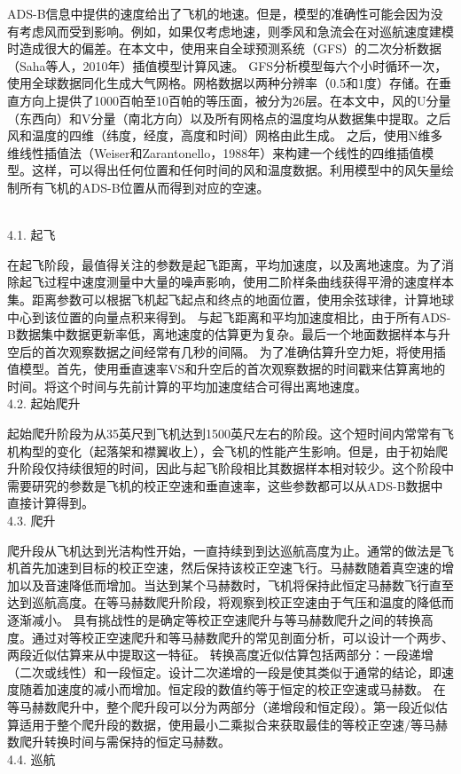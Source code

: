 \documentclass[a4paper,punct,space,heading=true,AutoFakeBold]{ctexrep}
\newcommand{\xiaosi}{\fontsize{12pt}{\baselineskip}\selectfont}
\begin{document}
ADS-B信息中提供的速度给出了飞机的地速。但是，模型的准确性可能会因为没有考虑风而受到影响。例如，如果仅考虑地速，则季风和急流会在对巡航速度建模时造成很大的偏差。在本文中，使用来自全球预测系统（GFS）的二次分析数据（Saha等人，2010年）插值模型计算风速。
GFS分析模型每六个小时循环一次，使用全球数据同化生成大气网格。网格数据以两种分辨率（0.5和1度）存储。在垂直方向上提供了1000百帕至10百帕的等压面，被分为26层。在本文中，风的U分量（东西向）和V分量（南北方向）以及所有网格点的温度均从数据集中提取。之后风和温度的四维（纬度，经度，高度和时间）网格由此生成。
之后，使用N维多维线性插值法（Weiser和Zarantonello，1988年）来构建一个线性的四维插值模型。这样，可以得出任何位置和任何时间的风和温度数据。利用模型中的风矢量绘制所有飞机的ADS-B位置从而得到对应的空速。

{
	\noindent\xiaosi\bfseries{}
}\\
4.1. 起飞

在起飞阶段，最值得关注的参数是起飞距离，平均加速度，以及离地速度。为了消除起飞过程中速度测量中大量的噪声影响，使用二阶样条曲线获得平滑的速度样本集。距离参数可以根据飞机起飞起点和终点的地面位置，使用余弦球律，计算地球中心到该位置的向量点积来得到。
与起飞距离和平均加速度相比，由于所有ADS-B数据集中数据更新率低，离地速度的估算更为复杂。最后一个地面数据样本与升空后的首次观察数据之间经常有几秒的间隔。
为了准确估算升空力矩，将使用插值模型。首先，使用垂直速率VS和升空后的首次观察数据的时间戳来估算离地的时间。将这个时间与先前计算的平均加速度结合可得出离地速度。\\
4.2. 起始爬升

起始爬升阶段为从35英尺到飞机达到1500英尺左右的阶段。这个短时间内常常有飞机构型的变化（起落架和襟翼收上），会飞机的性能产生影响。但是，由于初始爬升阶段仅持续很短的时间，因此与起飞阶段相比其数据样本相对较少。这个阶段中需要研究的参数是飞机的校正空速和垂直速率，这些参数都可以从ADS-B数据中直接计算得到。\\
4.3. 爬升

爬升段从飞机达到光洁构性开始，一直持续到到达巡航高度为止。通常的做法是飞机首先加速到目标的校正空速，然后保持该校正空速飞行。马赫数随着真空速的增加以及音速降低而增加。当达到某个马赫数时，飞机将保持此恒定马赫数飞行直至达到巡航高度。在等马赫数爬升阶段，将观察到校正空速由于气压和温度的降低而逐渐减小。
具有挑战性的是确定等校正空速爬升与等马赫数爬升之间的转换高度。通过对等校正空速爬升和等马赫数爬升的常见剖面分析，可以设计一个两步、两段近似估算来从中提取这一特征。
转换高度近似估算包括两部分：一段递增（二次或线性）和一段恒定。设计二次递增的一段是使其类似于通常的结论，即速度随着加速度的减小而增加。恒定段的数值约等于恒定的校正空速或马赫数。
在等马赫数爬升中，整个爬升段可以分为两部分（递增段和恒定段）。第一段近似估算适用于整个爬升段的数据，使用最小二乘拟合来获取最佳的等校正空速/等马赫数爬升转换时间与需保持的恒定马赫数。\\
4.4. 巡航
\end{document}
